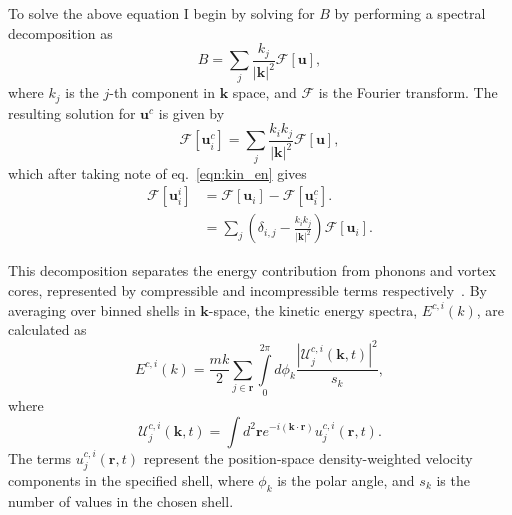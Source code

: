 To solve the above equation I begin by solving for $B$ by performing a spectral decomposition as
\begin{equation}
    B = \displaystyle\sum\limits_{j} \frac{k_j}{|\mathbf{k}|^2}\mathscr{F}[\mathbf{u}],
\end{equation}
where $k_j$ is the $j$-th component in $\mathbf{k}$ space, and $\mathscr{F}$ is the Fourier transform. The resulting solution for $\mathbf{u}^c$ is given by
\begin{equation}
    \mathscr{F}[\mathbf{u}_i^c] = \displaystyle\sum\limits_{j} \frac{k_i k_j}{|\mathbf{k}|^2} \mathscr{F}[\mathbf{u}],
\end{equation}
which after taking note of eq.~\ref{eqn:kin_en} gives
\begin{align}
    \mathscr{F}[\mathbf{u}_i^i] &= \mathscr{F}[\mathbf{u}_i] - \mathscr{F}[\mathbf{u}_i^c]. \\
    &= \displaystyle\sum\limits_{j}\left(\delta_{i,j} - \frac{k_ik_j}{|\mathbf{k}|^2}\right)\mathscr{F}[\mathbf{u}_i].
\end{align}



This decomposition separates the energy contribution from phonons and vortex cores, represented by compressible and incompressible terms respectively~\cite{CT:Horng_pra_2009}. By averaging over binned shells in $\mathbf{k}$-space, the kinetic energy spectra, $E^{c,i}(k)$, are calculated as~\cite{CT:Bradley_prx_2012}
\begin{equation}
	E^{c,i}(k) = \frac{mk}{2}\sum\limits_{j\in\mathbf{r}} \int\limits_{0}^{2\pi}d\phi_k \frac{ |\mathcal{U}_j^{c,i}(\mathbf{k},t) |^2}{s_k},
\end{equation}
where
\begin{equation}
	\mathcal{U}_j^{c,i}(\mathbf{k},t) = \int d^2 \mathbf{r} e^{-i(\mathbf{k}\cdot\mathbf{r})} u_j^{c,i}(\mathbf{r},t).
\end{equation}
The terms $u_j^{c,i}(\mathbf{r},t)$ represent the position-space density-weighted velocity components in the specified shell, where $\phi_k$ is the polar angle, and $s_k$ is the number of values in the chosen shell.

\fi

